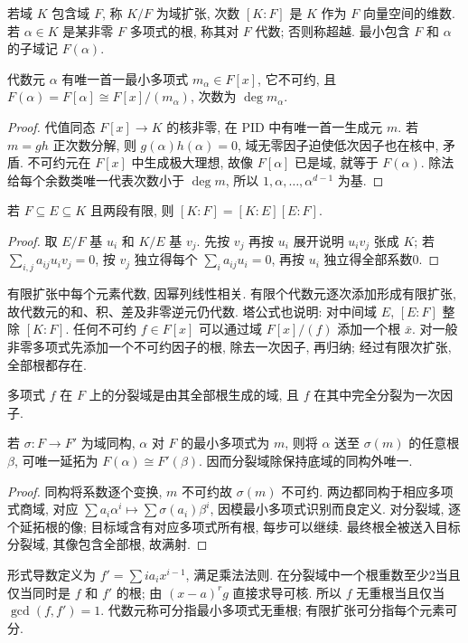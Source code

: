 \begin{definition}
若域 $K$ 包含域 $F$, 称 $K/F$ 为域扩张, 次数 $[K:F]$ 是 $K$ 作为 $F$ 向量空间的维数. 若 $\alpha\in K$ 是某非零 $F$ 多项式的根, 称其对 $F$ 代数; 否则称超越. 最小包含 $F$ 和 $\alpha$ 的子域记 $F(\alpha)$.
\end{definition}
\begin{theorem}\label{thm:minpoly}
代数元 $\alpha$ 有唯一首一最小多项式 $m_\alpha\in F[x]$, 它不可约, 且
$F(\alpha)=F[\alpha]\cong F[x]/(m_\alpha)$, 次数为 $\deg m_\alpha$.
\end{theorem}
\begin{proof}
代值同态 $F[x]\to K$ 的核非零, 在 PID 中有唯一首一生成元 $m$. 若 $m=gh$ 正次数分解, 则 $g(\alpha)h(\alpha)=0$, 域无零因子迫使低次因子也在核中, 矛盾. 不可约元在 $F[x]$ 中生成极大理想, 故像 $F[\alpha]$ 已是域, 就等于 $F(\alpha)$. 除法给每个余数类唯一代表次数小于 $\deg m$, 所以 $1,\alpha,\ldots,\alpha^{d-1}$ 为基.
\end{proof}
\begin{theorem}[塔公式]\label{thm:tower}
若 $F\subseteq E\subseteq K$ 且两段有限, 则 $[K:F]=[K:E][E:F]$.
\end{theorem}
\begin{proof}
取 $E/F$ 基 $u_i$ 和 $K/E$ 基 $v_j$. 先按 $v_j$ 再按 $u_i$ 展开说明 $u_iv_j$ 张成 $K$; 若 $\sum_{i,j}a_{ij}u_iv_j=0$, 按 $v_j$ 独立得每个 $\sum_i a_{ij}u_i=0$, 再按 $u_i$ 独立得全部系数0.
\end{proof}
有限扩张中每个元素代数, 因幂列线性相关. 有限个代数元逐次添加形成有限扩张, 故代数元的和、积、差及非零逆元仍代数. 塔公式也说明: 对中间域 $E$, $[E:F]$ 整除 $[K:F]$.
任何不可约 $f\in F[x]$ 可以通过域 $F[x]/(f)$ 添加一个根 $\bar x$. 对一般非零多项式先添加一个不可约因子的根, 除去一次因子, 再归纳; 经过有限次扩张, 全部根都存在.
\begin{definition}
多项式 $f$ 在 $F$ 上的分裂域是由其全部根生成的域, 且 $f$ 在其中完全分裂为一次因子.
\end{definition}
\begin{lemma}[嵌入延拓]\label{lem:extend}
若 $\sigma:F\to F'$ 为域同构, $\alpha$ 对 $F$ 的最小多项式为 $m$, 则将 $\alpha$ 送至 $\sigma(m)$ 的任意根 $\beta$, 可唯一延拓为 $F(\alpha)\cong F'(\beta)$. 因而分裂域除保持底域的同构外唯一.
\end{lemma}
\begin{proof}
同构将系数逐个变换, $m$ 不可约故 $\sigma(m)$ 不可约. 两边都同构于相应多项式商域, 对应 $\sum a_i\alpha^i\mapsto\sum\sigma(a_i)\beta^i$, 因模最小多项式识别而良定义. 对分裂域, 逐个延拓根的像; 目标域含有对应多项式所有根, 每步可以继续. 最终根全被送入目标分裂域, 其像包含全部根, 故满射.
\end{proof}
形式导数定义为 $f'=\sum i a_ix^{i-1}$, 满足乘法法则. 在分裂域中一个根重数至少2当且仅当同时是 $f$ 和 $f'$ 的根; 由 $(x-a)^rg$ 直接求导可核. 所以 $f$ 无重根当且仅当 $\gcd(f,f')=1$. 代数元称可分指最小多项式无重根; 有限扩张可分指每个元素可分.

